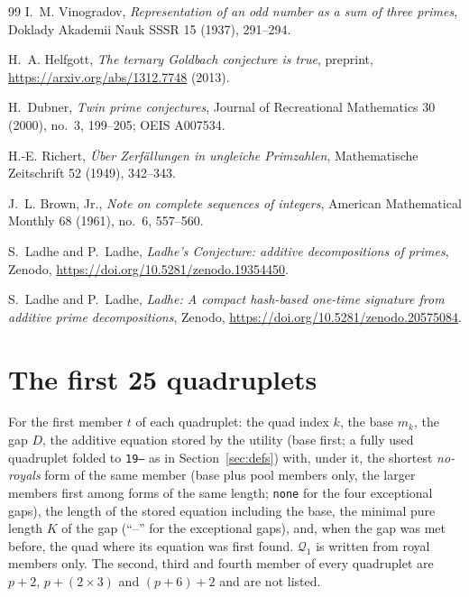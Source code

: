 \documentclass[11pt,a4paper]{article}
\newcommand{\Q}{\mathcal{Q}}
\newcommand{\code}[1]{\texttt{#1}}
\begin{document}
\begin{thebibliography}{99}
I.~M. Vinogradov,
\emph{Representation of an odd number as a sum of three primes},
Doklady Akademii Nauk SSSR 15 (1937), 291--294.

H.~A. Helfgott,
\emph{The ternary Goldbach conjecture is true},
preprint, \url{https://arxiv.org/abs/1312.7748} (2013).

H.~Dubner,
\emph{Twin prime conjectures},
Journal of Recreational Mathematics 30 (2000), no.~3, 199--205;
OEIS A007534.

H.-E. Richert,
\emph{\"Uber Zerf\"allungen in ungleiche Primzahlen},
Mathematische Zeitschrift 52 (1949), 342--343.

J.~L. Brown, Jr.,
\emph{Note on complete sequences of integers},
American Mathematical Monthly 68 (1961), no.~6, 557--560.

S.~Ladhe and P.~Ladhe,
\emph{Ladhe's Conjecture: additive decompositions of primes},
Zenodo, \url{https://doi.org/10.5281/zenodo.19354450}.

S.~Ladhe and P.~Ladhe,
\emph{Ladhe: A compact hash-based one-time signature from additive prime
decompositions},
Zenodo, \url{https://doi.org/10.5281/zenodo.20575084}.

\end{thebibliography}

\appendix

\section{The first 25 quadruplets}
\label{app:table}

For the first member $t$ of each quadruplet: the quad index $k$, the base
$m_k$, the gap $D$, the additive equation stored by the utility (base
first; a fully used quadruplet folded to \code{19--} as in
Section~\ref{sec:defs}) with, under it, the shortest \emph{no-royals} form
of the same member (base plus pool members only, the larger members first
among forms of the same length; \code{none} for the four exceptional
gaps), the length of the stored equation including the base, the minimal
pure length $K$ of the gap (``--'' for the exceptional gaps), and, when
the gap was met before, the quad where its equation was first found.
$\Q_1$ is written from royal members only. The second, third and fourth
member of every quadruplet are $p+2$, $p+(2\times3)$ and $(p+6)+2$ and are
not listed.
\end{document}
